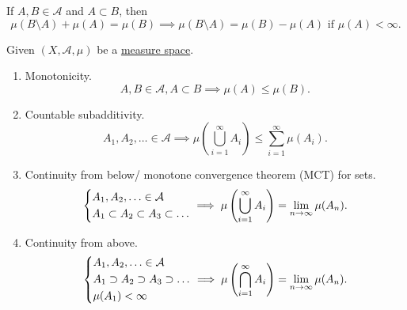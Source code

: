 \begin{note}
  If \(A, B\in \mathcal{A} \) and \(A\subset B\), then
  \[
    \mu(B\setminus A) + \mu(A) = \mu(B) \implies \mu(B \setminus A) = \mu(B) - \mu(A) \text{ if }\mu(A)<\infty.
  \]
\end{note}

\begin{theorem}\label{thm:measure-space}
  Given \((X, \mathcal{A} , \mu)\) be a \hyperref[def:measure-space]{measure space}.
  \begin{enumerate}
    \item \label{thm:measure-space-monotonicity}Monotonicity.
          \[
            A, B\in \mathcal{A} , A\subset B \implies \mu(A)\leq \mu(B).
          \]
    \item Countable subadditivity.
          \[
            A_1, A_2, \ldots \in \mathcal{A} \implies \mu\left(\bigcup\limits_{i=1}^{\infty} A_{i}\right) \leq \sum\limits_{i=1}^{\infty} \mu(A_{i}).
          \]
    \item \label{thm:measure-space-continuity-from-below} Continuity from below/ monotone convergence theorem (MCT) for sets.
          \[
            \begin{dcases}
              A_1, A_2, \ldots \in \mathcal{A} \\
              A_1\subset A_2\subset A_3\subset \ldots
            \end{dcases} \implies \mu\left(\bigcup\limits_{i=1}^{\infty} A_{i}\right) = \lim\limits_{n \to \infty} \mu(A_{n}).
          \]
    \item \label{thm:measure-space-continuity-from-above}Continuity from above.
          \[
            \begin{dcases}
              A_1, A_2, \ldots \in \mathcal{A}        \\
              A_1\supset A_2\supset A_3\supset \ldots \\
              \mu(A_1) < \infty
            \end{dcases} \implies \mu\left(\bigcap\limits_{i=1}^{\infty} A_{i}\right) = \lim\limits_{n \to \infty} \mu(A_{n}).
          \]
  \end{enumerate}
\end{theorem}
